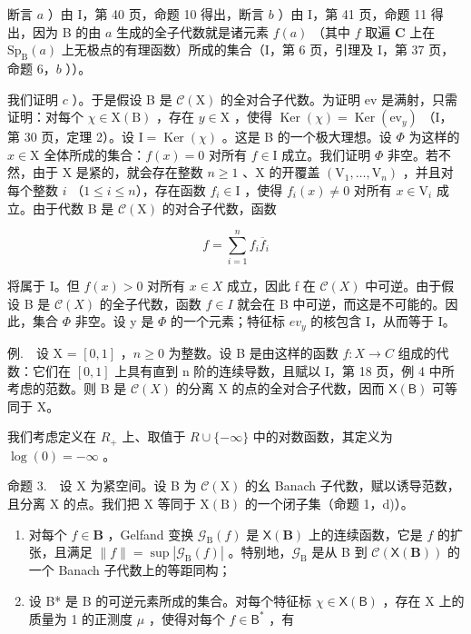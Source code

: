 断言 \(a\) ）由 I，第 40 页，命题 10 得出，断言 \(b\) ）由 I，第 41 页，命题 11 得出，因为 B 的由 \(a\) 生成的全子代数就是诸元素 \(f(a)\) （其中 \(f\) 取遍 \(\mathbf{C}\) 上在 \(\mathrm{Sp}_{\mathrm{B}}(a)\) 上无极点的有理函数）所成的集合（I，第 6 页，引理及 I，第 37 页，命题 6，\(b\) ））。

我们证明 \(c\) ）。于是假设 B 是 \(\mathcal{C}(\mathrm{X})\) 的全对合子代数。为证明 ev 是满射，只需证明：对每个 \(\chi \in \mathrm{X}(\mathrm{B})\) ，存在 \(y \in \mathrm{X}\) ，使得 \(\operatorname{Ker}(\chi) = \operatorname{Ker}(\mathrm{ev}_y)\) （I，第 30 页，定理 2）。设 \(\mathrm{I} = \operatorname{Ker}(\chi)\) 。这是 B 的一个极大理想。设 \(\Phi\) 为这样的 \(x \in \mathrm{X}\) 全体所成的集合：\(f(x) = 0\) 对所有 \(f \in \mathrm{I}\) 成立。我们证明 \(\Phi\) 非空。若不然，由于 X 是紧的，就会存在整数 \(n \geqslant 1\) 、X 的开覆盖 \((\mathrm{V}_1, \ldots, \mathrm{V}_n)\) ，并且对每个整数 \(i\) （\(1 \leqslant i \leqslant n\)），存在函数 \(f_i \in \mathrm{I}\) ，使得 \(f_i(x) \neq 0\) 对所有 \(x \in \mathrm{V}_i\) 成立。由于代数 B 是 \(\mathcal{C}(\mathrm{X})\) 的对合子代数，函数

\[
f = \sum_ {i = 1} ^ {n} f _ {i} \overline {{f}} _ {i}
\]

将属于 I。但 \(f(x) > 0\) 对所有 \(x \in X\) 成立，因此 f 在 \(\mathcal{C}(X)\) 中可逆。由于假设 B 是 \(\mathcal{C}(X)\) 的全子代数，函数 \(f \in I\) 就会在 B 中可逆，而这是不可能的。因此，集合 \(\Phi\) 非空。设 y 是 \(\Phi\) 的一个元素；特征标 \(ev_{y}\) 的核包含 I，从而等于 I。

例.　设 X = \([0,1]\) ，\(n \geqslant 0\) 为整数。设 B 是由这样的函数 \(f: X \to C\) 组成的代数：它们在 \([0,1]\) 上具有直到 n 阶的连续导数，且赋以 I，第 18 页，例 4 中所考虑的范数。则 B 是 \(\mathcal{C}(X)\) 的分离 X 的点的全对合子代数，因而 \(\mathsf{X}(\mathsf{B})\) 可等同于 X。

我们考虑定义在 \(R_{+}\) 上、取值于 \(R \cup \{-\infty\}\) 中的对数函数，其定义为 \(\log(0) = -\infty\) 。

命题 3.　设 X 为紧空间。设 B 为 \(\mathcal{C}(\mathrm{X})\) 的幺 Banach 子代数，赋以诱导范数，且分离 X 的点。我们把 X 等同于 \(\mathrm{X(B)}\) 的一个闭子集（命题 1，d)）。

\begin{enumerate}
\def\labelenumi{\alph{enumi})}
\item
  对每个 \(f \in \mathbf{B}\) ，Gelfand 变换 \(\mathcal{G}_{\mathrm{B}}(f)\) 是 \(\mathsf{X}(\mathbf{B})\) 上的连续函数，它是 \(f\) 的扩张，且满足 \(\| f \| = \sup |\mathcal{G}_{\mathrm{B}}(f)|\) 。特别地，\(\mathcal{G}_{\mathrm{B}}\) 是从 B 到 \(\mathcal{C}(\mathsf{X}(\mathbf{B}))\) 的一个 Banach 子代数上的等距同构；
\item
  设 B* 是 B 的可逆元素所成的集合。对每个特征标 \(\chi \in \mathsf{X}(\mathsf{B})\) ，存在 X 上的质量为 1 的正测度 \(\mu\) ，使得对每个 \(f \in \mathsf{B}^*\) ，有
\end{enumerate}

